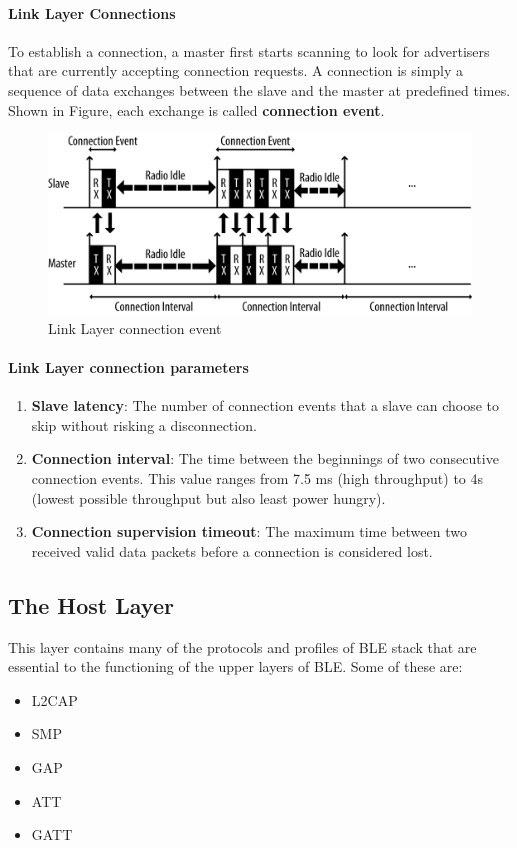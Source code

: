 \paragraph{Link Layer Connections}
To establish a connection, a master first starts scanning to look for advertisers that are currently accepting connection requests. A connection is simply a sequence of data exchanges between the slave and the master at predefined times. Shown in Figure, each exchange is called \textbf{connection event}.
\begin{figure}[ht]
	\centering
	\includegraphics[scale=0.2]{images/connection_event.png}
	\caption{Link Layer connection event}
\end{figure}
\paragraph{Link Layer connection parameters}
\begin{enumerate}
	\item \textbf{Slave latency}: The number of connection events that a slave can choose to skip without risking a disconnection.
	\item \textbf{Connection interval}: The time between the beginnings of two consecutive connection events. This value ranges from 7.5 ms (high throughput) to 4s (lowest possible throughput but also least power hungry).
	\item \textbf{Connection supervision timeout}: The maximum time between two received valid data packets before a connection is considered lost.
\end{enumerate}
\subsection{The Host Layer}
This layer contains many of the protocols and profiles of BLE stack that are essential to the functioning of the upper layers of BLE. Some of these are:
\begin{itemize}
	\item L2CAP
	\item SMP
	\item GAP
	\item ATT
	\item GATT
\end{itemize}
